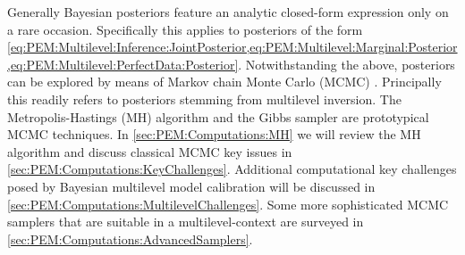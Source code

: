 Generally Bayesian posteriors feature an analytic closed-form expression only on a rare occasion.
Specifically this applies to posteriors of the form \cref{eq:PEM:Multilevel:Inference:JointPosterior,eq:PEM:Multilevel:Marginal:Posterior,eq:PEM:Multilevel:PerfectData:Posterior}.
Notwithstanding the above, posteriors can be explored by means of Markov chain Monte Carlo (MCMC) \cite{MCMC:Gilks1996,MCMC:Robert2004}.
Principally this readily refers to posteriors stemming from multilevel inversion.
The Metropolis-Hastings (MH) algorithm and the Gibbs sampler are prototypical MCMC techniques.
In \cref{sec:PEM:Computations:MH} we will review the MH algorithm and discuss classical MCMC key issues in \cref{sec:PEM:Computations:KeyChallenges}.
Additional computational key challenges posed by Bayesian multilevel model calibration will be discussed in \cref{sec:PEM:Computations:MultilevelChallenges}.
Some more sophisticated MCMC samplers that are suitable in a multilevel-context are surveyed in \cref{sec:PEM:Computations:AdvancedSamplers}.

